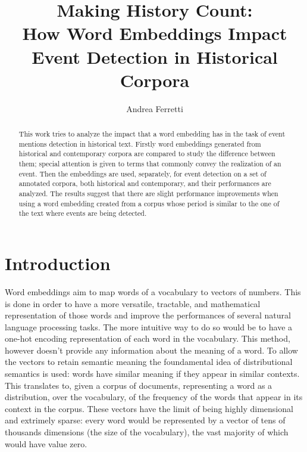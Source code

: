\documentclass[runningheads]{llncs}
\begin{document}
%
\title{Making History Count:\\
How Word Embeddings Impact\\
Event Detection in Historical Corpora}

%
%
\author{Andrea Ferretti}
%
%
%
\maketitle              %
%
\begin{abstract}
This work tries to analyze the impact that a word embedding has in the task of event mentions detection in historical text. Firstly word embeddings generated from historical and contemporary corpora are compared to study the difference between them; special attention is given to terms that commonly convey the realization of an event. Then the embeddings are used, separately, for event detection on a set of annotated corpora, both historical and contemporary, and their performances are analyzed. The results suggest that there are slight performance improvements when using a word embedding created from a corpus whose period is similar to the one of the text where events are being detected.

\end{abstract}
%
%
%
\section{Introduction}
Word embeddings aim to map words of a vocabulary to vectors of numbers. This is done in order to have a more versatile, tractable, and mathematical representation of those words and improve the performances of several natural language processing tasks. The more intuitive way to do so would be to have a one-hot encoding representation of each word in the vocabulary. This method, however doesn't provide any information about the meaning of a word. To allow the vectors to retain semantic meaning the foundamental idea of distributional semantics is used: words have similar meaning if they appear in similar contexts. This translates to, given a corpus of documents, representing a word as a distribution, over the vocabulary, of the frequency of the words that appear in its context in the corpus. These vectors have the limit of being highly dimensional and extrimely sparse: every word would be represented by a vector of tens of thousands dimensions (the size of the vocabulary), the vast majority of which would have value zero.
\end{document}
